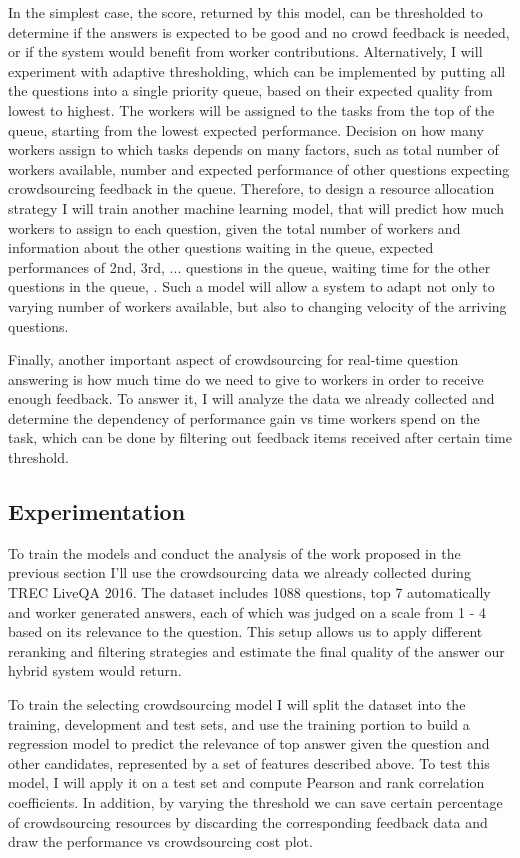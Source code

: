 In the simplest case, the score, returned by this model, can be thresholded to determine if the answers is expected to be good and no crowd feedback is needed, or if the system would benefit from worker contributions.
Alternatively, I will experiment with adaptive thresholding, which can be implemented by putting all the questions into a single priority queue, based on their expected quality from lowest to highest.
The workers will be assigned to the tasks from the top of the queue, \ie starting from the lowest expected performance.
Decision on how many workers assign to which tasks depends on many factors, such as total number of workers available, number and expected performance of other questions expecting crowdsourcing feedback in the queue.
Therefore, to design a resource allocation strategy I will train another machine learning model, that will predict how much workers to assign to each question, given the total number of workers and information about the other questions waiting in the queue, \ie expected performances of 2nd, 3rd, ... questions in the queue, waiting time for the other questions in the queue, \etc.
Such a model will allow a system to adapt not only to varying number of workers available, but also to changing velocity of the arriving questions.

Finally, another important aspect of crowdsourcing for real-time question answering is how much time do we need to give to workers in order to receive enough feedback.
To answer it, I will analyze the data we already collected and determine the dependency of performance gain vs time workers spend on the task, which can be done by filtering out feedback items received after certain time threshold.

\subsection{Experimentation}
\label{section:crowdsourcing:experiments}

To train the models and conduct the analysis of the work proposed in the previous section I'll use the crowdsourcing data we already collected during TREC LiveQA 2016.
The dataset includes 1088 questions, top 7 automatically and worker generated answers, each of which was judged on a scale from 1 - 4 based on its relevance to the question.
This setup allows us to apply different reranking and filtering strategies and estimate the final quality of the answer our hybrid system would return.

To train the selecting crowdsourcing model I will split the dataset into the training, development and test sets, and use the training portion to build a regression model to predict the relevance of top answer given the question and other candidates, represented by a set of features described above.
To test this model, I will apply it on a test set and compute Pearson and rank correlation coefficients.
In addition, by varying the threshold we can save certain percentage of crowdsourcing resources by discarding the corresponding feedback data and draw the performance vs crowdsourcing cost plot.

